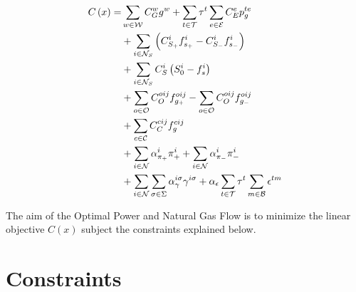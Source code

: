 
\begin{equation}
\begin{aligned}
C \left( x \right) = & \sum_{w \in \cal{W}}{C^{w}_{G} g^{w}} + \sum_{t \in \cal{T}} {\tau}^{t}  \sum_{e \in \cal{E}} {C^{e}_{E} p_{g}^{te}}\\ 
				& + \sum_{i \in {\cal{N}}_{S}}{\left({C^{i}_{S_+} f^{i}_{s_+}} - {C^{i}_{S_-} f^{i}_{s_-}}  \right)}\\
				& + \sum_{i \in {\cal{N}}_{S}}{C^{i}_{S} \left( S^{i}_{0} - f^{i}_{s} \right)} \\
				& + \sum_{o \in \cal{O}}{C^{oij}_{O} f^{oij}_{g_+}} - \sum_{o \in \cal{O}}{C^{oij}_{O} f^{oij}_{g_-}} \\
				& + \sum_{c \in \cal{C}}{C^{cij}_{C} f^{cij}_{g}} \\ 
				& + \sum_{i \in \cal{N}}{\alpha^{i}_{\pi_+} \pi^{i}_{+}} + \sum_{i \in \cal{N}}{ \alpha^{i}_{\pi_-} \pi^{i}_{-}} \\
				& + \sum_{i \in \cal{N}}\sum_{\sigma \in \Sigma} {\alpha_{\gamma}^{i \sigma}\gamma^{i \sigma}} + \alpha_{\epsilon} \sum_{t \in \cal{T}} {\tau}^{t} \sum_{m \in \cal{B}} {\epsilon^{tm}}  
\end{aligned}
\label{eq:obj_func}
\vspace{0.3cm}
\end{equation}

The aim of the Optimal Power and Natural Gas Flow is to minimize the linear objective $C(x)$ subject the constraints explained below.

\section{Constraints}

